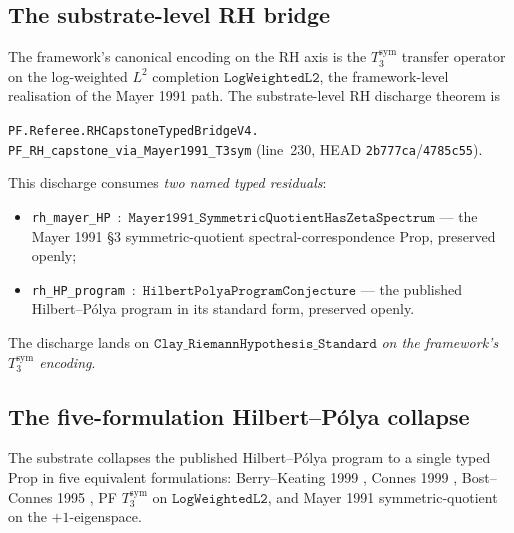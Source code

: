 \documentclass[11pt,a4paper]{article}
\theoremstyle{plain}
\theoremstyle{definition}
\begin{document}
\subsection{The substrate-level RH bridge}
\label{sec:rh-bridge}

The framework's canonical encoding on the RH axis is the
$T_{3}^{\mathrm{sym}}$ transfer operator on the log-weighted $L^{2}$
completion $\mathtt{LogWeightedL2}$, the framework-level realisation
of the Mayer 1991 path. The substrate-level RH discharge theorem is

\medskip
\hspace*{1em}\texttt{PF.Referee.RHCapstoneTypedBridgeV4.}\\
\hspace*{1em}\texttt{PF\_RH\_capstone\_via\_Mayer1991\_T3sym}
(line~230, HEAD \texttt{2b777ca}/\texttt{4785c55}).
\medskip

This discharge consumes \emph{two named typed residuals}:
\begin{itemize}[leftmargin=*,nosep]
\item \texttt{rh\_mayer\_HP} \,:\,
  $\mathtt{Mayer1991\_SymmetricQuotientHasZetaSpectrum}$ ---
  the Mayer 1991 \S3 symmetric-quotient spectral-correspondence
  Prop, preserved openly;
\item \texttt{rh\_HP\_program} \,:\,
  $\mathtt{HilbertPolyaProgramConjecture}$ --- the published
  Hilbert--P\'olya program in its standard form, preserved openly.
\end{itemize}
The discharge lands on $\mathtt{Clay\_RiemannHypothesis\_Standard}$
\emph{on the framework's $T_{3}^{\mathrm{sym}}$ encoding}.

\medskip

\noindent{}

\subsection{The five-formulation Hilbert--P\'olya collapse}
\label{sec:hp-five}

The substrate collapses the published Hilbert--P\'olya program to a
single typed Prop in five equivalent formulations: Berry--Keating
1999 \cite{berry_keating1999}, Connes 1999 \cite{connes1999},
Bost--Connes 1995 \cite{bost_connes1995}, PF $T_{3}^{\mathrm{sym}}$
on $\mathtt{LogWeightedL2}$, and Mayer 1991 \cite{mayer1991}
symmetric-quotient on the $+1$-eigenspace.
\end{document}
